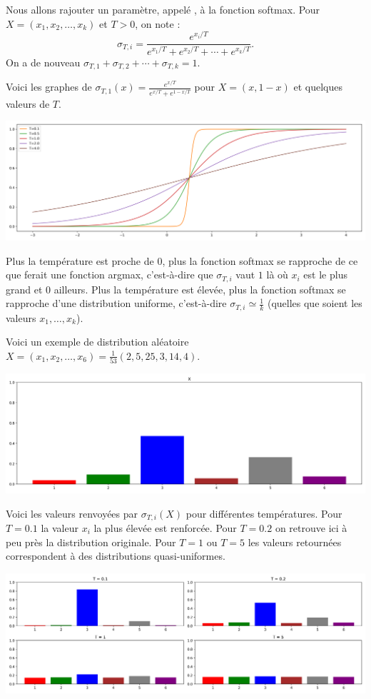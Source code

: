\documentclass[11pt,class=report,crop=false]{standalone}
\begin{document}
Nous allons rajouter un paramètre, appelé , à la fonction softmax.
Pour $X = (x_1,x_2,\ldots,x_k)$ et $T > 0$, on note :
$$\sigma_{T,i}  = \frac{e^{x_i/T}}{ e^{x_1/T} + e^{x_2/T} + \cdots + e^{x_k/T} }.$$
On a de nouveau $\sigma_{T,1} + \sigma_{T,2} + \cdots + \sigma_{T,k} = 1$.

Voici les graphes de $\sigma_{T,1}(x) = \frac{e^{x/T}}{e^{x/T}+e^{{1-x}/T}}$ pour $X = (x,1-x)$ et quelques valeurs de $T$.

\begin{center}
	\includegraphics[scale=\myscale,scale=0.4]{figures/softmax-02}
\end{center}

Plus la température est proche de $0$, plus la fonction softmax se rapproche de ce que ferait une fonction argmax, c'est-à-dire que $\sigma_{T,i}$ vaut $1$ là où $x_i$ est le plus grand et $0$ ailleurs.
Plus la température est élevée, plus la fonction softmax se rapproche d'une distribution uniforme, c'est-à-dire $\sigma_{T,i} \simeq \frac 1k$ (quelles que soient les valeurs $x_1,\ldots,x_k$).

Voici un exemple de distribution aléatoire $X = (x_1,x_2,\ldots,x_6) = \frac{1}{53}(2,5,25,3,14,4)$.
\begin{center}
	\includegraphics[scale=\myscale,scale=0.4]{figures/softmax-03}
\end{center}

Voici les valeurs renvoyées par $\sigma_{T,i}(X)$ pour différentes températures. Pour $T=0.1$ la valeur $x_i$ la plus élevée est renforcée. Pour $T=0.2$ on retrouve ici à peu près la distribution originale. Pour $T=1$ ou $T=5$ les valeurs retournées correspondent à des distributions quasi-uniformes. 
\begin{center}
	\includegraphics[scale=\myscale,scale=0.4]{figures/softmax-04}
\end{center}
\end{document}
